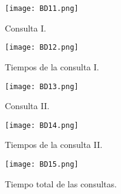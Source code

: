 \documentclass[a4paper, 11pt]{article} %
\begin{document}
\begin{itemize}
\pagebreak

\begin{figure}[H]
\centering 
\texttt{[image: BD11.png]} 
\caption{Consulta I.} 
\label{contexto:figura} 
\end{figure}

\begin{figure}[H]
\centering 
\texttt{[image: BD12.png]} 
\caption{Tiempos de la consulta I.} 
\label{contexto:figura} 
\end{figure}

\pagebreak

\begin{figure}[H]
\centering 
\texttt{[image: BD13.png]} 
\caption{Consulta II.} 
\label{contexto:figura} 
\end{figure}

\begin{figure}[H]
\centering 
\texttt{[image: BD14.png]} 
\caption{Tiempos de la consulta II.} 
\label{contexto:figura} 
\end{figure}

\begin{figure}[H]
\centering 
\texttt{[image: BD15.png]} 
\caption{Tiempo total de las consultas.} 
\label{contexto:figura} 
\end{figure}
\end{itemize}

\pagebreak
\end{document}
